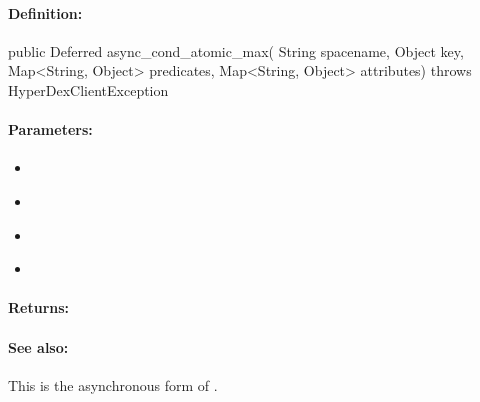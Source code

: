 \paragraph{Definition:}
\begin{javacode}
public Deferred async_cond_atomic_max(
        String spacename,
        Object key,
        Map<String, Object> predicates,
        Map<String, Object> attributes) throws HyperDexClientException
\end{javacode}

\paragraph{Parameters:}
\begin{itemize}[noitemsep]
\item {}\\

\item {}\\

\item {}\\

\item {}\\

\end{itemize}

\paragraph{Returns:}


\paragraph{See also:}  This is the asynchronous form of .

\pagebreak
\subsubsection{}
\label{api:java:group_string_prepend}


